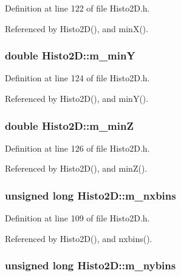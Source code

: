 Definition at line 122 of file Histo2D.h.

Referenced by Histo2D(), and minX().\hypertarget{classHisto2D_a5bea9523f4ac077b0cc72cc1b28e0834}{
\subsubsection[{m\_\-minY}]{\setlength{\rightskip}{0pt plus 5cm}double {\bf Histo2D::m\_\-minY}}}
\label{classHisto2D_a5bea9523f4ac077b0cc72cc1b28e0834}


Definition at line 124 of file Histo2D.h.

Referenced by Histo2D(), and minY().\hypertarget{classHisto2D_a6cfa2290ee0d786b37f7ed08129c60e3}{
\subsubsection[{m\_\-minZ}]{\setlength{\rightskip}{0pt plus 5cm}double {\bf Histo2D::m\_\-minZ}}}
\label{classHisto2D_a6cfa2290ee0d786b37f7ed08129c60e3}


Definition at line 126 of file Histo2D.h.

Referenced by Histo2D(), and minZ().\hypertarget{classHisto2D_a39a9d29010bf81c546a1ad1b01f7cb43}{
\subsubsection[{m\_\-nxbins}]{\setlength{\rightskip}{0pt plus 5cm}unsigned long {\bf Histo2D::m\_\-nxbins}}}
\label{classHisto2D_a39a9d29010bf81c546a1ad1b01f7cb43}


Definition at line 109 of file Histo2D.h.

Referenced by Histo2D(), and nxbins().\hypertarget{classHisto2D_afebeb164369fa9cea59f226d71907e3d}{
\subsubsection[{m\_\-nybins}]{\setlength{\rightskip}{0pt plus 5cm}unsigned long {\bf Histo2D::m\_\-nybins}}}
\label{classHisto2D_afebeb164369fa9cea59f226d71907e3d}


